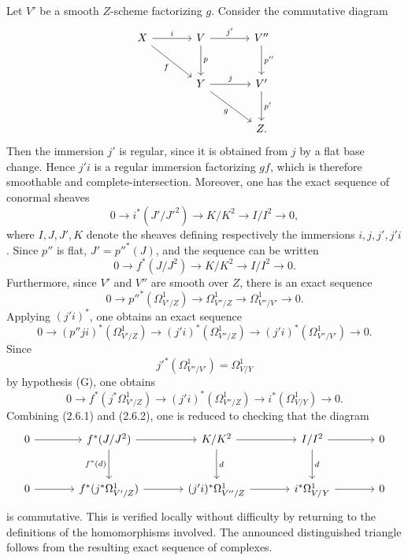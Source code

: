 Let $V'$ be a smooth $Z$-scheme factorizing $g$. Consider the commutative diagram
\[
\begin{tikzcd}[column sep=large,row sep=large]
X \arrow[r,"i"] \arrow[dr,"f"'] & V \arrow[r,"j'"] \arrow[d,"p"] & V'' \arrow[d,"p''"]\\
& Y \arrow[r,"j"] \arrow[dr,"g"'] & V' \arrow[d,"p'"]\\
& & Z .
\end{tikzcd}
\]
Then the immersion $j'$ is regular, since it is obtained from $j$ by a flat base change. Hence $j'i$ is a regular immersion factorizing $gf$, which is therefore smoothable and complete-intersection. Moreover, one has the exact sequence of conormal sheaves
\[
0\longrightarrow i^*(J'/J'^2)\longrightarrow K/K^2\longrightarrow I/I^2\longrightarrow0,
\]
where $I,J,J',K$ denote the sheaves defining respectively the immersions $i,j,j',j'i$. Since $p''$ is flat, $J'=p''^*(J)$, and the sequence can be written
\begin{equation}\tag{2.6.1}
0\longrightarrow f^*(J/J^2)\longrightarrow K/K^2\longrightarrow I/I^2\longrightarrow0.
\end{equation}
Furthermore, since $V'$ and $V''$ are smooth over $Z$, there is an exact sequence
\[
0\longrightarrow p''^*(\Omega^1_{V'/Z})\longrightarrow\Omega^1_{V''/Z}\longrightarrow\Omega^1_{V''/V'}\longrightarrow0.
\]
Applying $(j'i)^*$, one obtains an exact sequence
\[
0\longrightarrow (p''ji)^*(\Omega^1_{V'/Z})\longrightarrow (j'i)^*(\Omega^1_{V''/Z})\longrightarrow (j'i)^*(\Omega^1_{V''/V'})\longrightarrow0.
\]
Since
\[
j'^*(\Omega^1_{V''/V'})=\Omega^1_{V/Y}
\]
by hypothesis (G), one obtains
\begin{equation}\tag{2.6.2}
0\longrightarrow f^*(j^*\Omega^1_{V'/Z})\longrightarrow (j'i)^*(\Omega^1_{V''/Z})\longrightarrow i^*(\Omega^1_{V/Y})\longrightarrow0.
\end{equation}
Combining (2.6.1) and (2.6.2), one is reduced to checking that the diagram
\[
\begin{tikzcd}[column sep=large,row sep=large]
0 \arrow[r] & f^*(J/J^2) \arrow[r] \arrow[d,"f^*(d)"'] & K/K^2 \arrow[r] \arrow[d,"d"] & I/I^2 \arrow[r] \arrow[d,"d"] & 0\\
0 \arrow[r] & f^*(j^*\Omega^1_{V'/Z}) \arrow[r] & (j'i)^*\Omega^1_{V''/Z} \arrow[r] & i^*\Omega^1_{V/Y} \arrow[r] & 0
\end{tikzcd}
\]
is commutative. This is verified locally without difficulty by returning to the definitions of the homomorphisms involved. The announced distinguished triangle follows from the resulting exact sequence of complexes.

